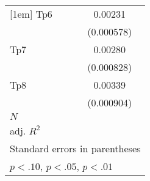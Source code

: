 \begin{table}[htbp]
\begin{tabular}{l*{1}{c}}
[1em]
Tp6         &     0.00231\sym{***}\\
            &  (0.000578)         \\
[1em]
Tp7         &     0.00280\sym{***}\\
            &  (0.000828)         \\
[1em]
Tp8         &     0.00339\sym{***}\\
            &  (0.000904)         \\
\hline
\(N\)       &                     \\
adj. \(R^{2}\)&                     \\
\hline\hline
\multicolumn{2}{l}{\footnotesize Standard errors in parentheses}\\
\multicolumn{2}{l}{\footnotesize \sym{*} \(p<.10\), \sym{**} \(p<.05\), \sym{***} \(p<.01\)}\\
\end{tabular}
\end{table}
